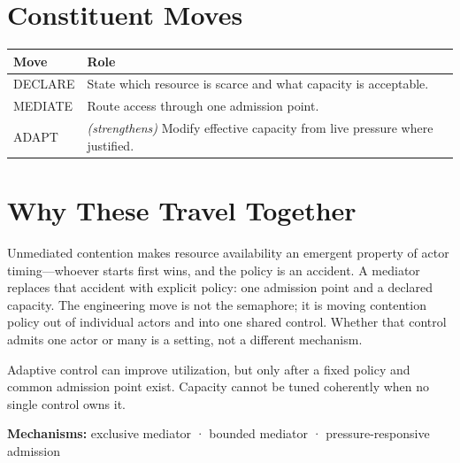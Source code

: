 \section{Constituent Moves}\label{heading:constituent-moves}

{\footnotesize
{\def\LTcaptype{none} %
\begin{longtable}[]{@{}
  >{\raggedright\arraybackslash}p{}
  >{\raggedright\arraybackslash}p{}@{}}
\toprule\noalign{}
\begin{minipage}[b]{\linewidth}\raggedright
Move
\end{minipage} & \begin{minipage}[b]{\linewidth}\raggedright
Role
\end{minipage} \\
\midrule\noalign{}
\endhead
\bottomrule\noalign{}
\endlastfoot
DECLARE & State which resource is scarce and what capacity is acceptable. \\
MEDIATE & Route access through one admission point. \\
ADAPT & \emph{(strengthens)} Modify effective capacity from live pressure where justified. \\
\end{longtable}
}
}

\section{Why These Travel Together}\label{heading:why-these-travel-together}

Unmediated contention makes resource availability an emergent property of actor timing---whoever starts first wins, and the policy is an accident. A mediator replaces that accident with explicit policy: one admission point and a declared capacity. The engineering move is not the semaphore; it is moving contention policy out of individual actors and into one shared control. Whether that control admits one actor or many is a setting, not a different mechanism.

Adaptive control can improve utilization, but only after a fixed policy and common admission point exist. Capacity cannot be tuned coherently when no single control owns it.

\textbf{Mechanisms:} exclusive mediator · bounded mediator · pressure-responsive admission
